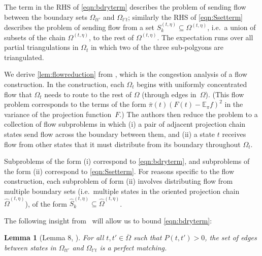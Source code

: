 \documentclass[a4paper, 12p]{article}
\numberwithin{equation}{section}
\newcommand{\Exp}{\mathbb{E}}
\newcommand{\FF}{F}
\newcommand{\Omproj}{\overline{\Omega}}
\newcommand{\piproj}{\overline{\pi}}
\newcommand{\Omorproj}{\hat{\Omega}}
\newtheorem{lemma}[theorem]{Lemma}
\begin{document}
The term in the RHS of \eqref{eqn:bdryterm} describes the problem of sending flow between the boundary sets $\Omega_{tt'}$ and $\Omega_{t't}$; similarly the RHS of \eqref{eqn:Ssetterm} describes the problem of sending flow from a set $S_k^{(t, \eta)} \subseteq \Omega^{(t,\eta)}$, i.e.~a union of subsets of the chain $\Omega^{(t,\eta)}$, to the rest of $\Omega^{(t,\eta)}$. The expectation runs over all partial triangulations in $\Omega_t$ in which two of the three sub-polgyons are triangulated.

We derive \cref{lem:flowreduction} from \cite[Lemma 32]{eppstein2022improvedfull}, which is the congestion analysis of a flow construction. In the construction, each $\Omega_t$ begins with  uniformly concentrated flow that $\Omega_t$ needs to route to the rest of $\Omega$ (through edges in~$\Omega$). (This flow problem corresponds to the terms of the form $\piproj(t)(F(t) - \Exp_{\pi} f)^2$ in the variance of the projection function~$\FF$.) The authors then reduce the problem to a collection of flow subproblems in which (i) a pair of adjacent projection chain states send flow across the boundary between them, and (ii) a state $t$ receives flow from other states that it must distribute from its boundary throughout $\Omega_t$. 

Subproblems of the form (i) correspond to \eqref{eqn:bdryterm}, and subproblems of the form (ii) correspond to \eqref{eqn:Ssetterm}. For reasons specific to the flow construction, each subproblem of form (ii) involves distributing flow from multiple boundary sets (i.e.~multiple states in the oriented projection chain $\Omorproj^{(t,\eta)}$), of the form $\hat S_k^{(t, \eta)} \subseteq \Omorproj^{(t, \eta)}$.

The following insight from~\cite{eppstein2022improved} will allow us to bound \eqref{eqn:bdryterm}:
\begin{lemma}[Lemma 8, \cite{eppstein2022improved}]
    For all $t, t' \in \Omproj$ such that $P(t, t') > 0$, 
    the set of edges between states in $\Omega_{tt'}$ and $\Omega_{t't}$ is a perfect matching.
    \label{rmk:perfmat}
\end{lemma}
\end{document}
